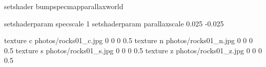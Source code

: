 setshader bumpspecmapparallaxworld

setshaderparam specscale 1
setshaderparam parallaxscale 0.025 -0.025

texture c photos/rocks01_c.jpg 0 0 0 0.5
texture n photos/rocks01_n.jpg 0 0 0 0.5
texture s photos/rocks01_s.jpg 0 0 0 0.5
texture z photos/rocks01_z.jpg 0 0 0 0.5
